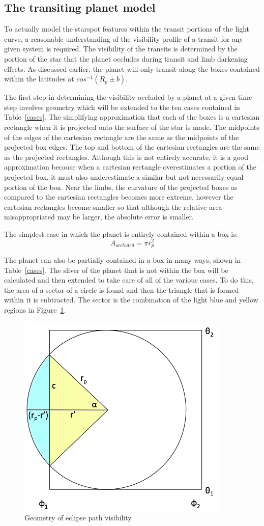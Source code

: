 \subsection{The transiting planet model \label{transit_model}}
To actually model the starspot features within the transit portions of the light curve, a reasonable understanding of the visibility profile of a transit for any given system is required. The visibility of the transits is determined by the portion of the star that the planet occludes during transit and limb darkening effects. As discussed earlier, the planet will only transit along the boxes contained within the latitudes at $cos^{-1}(R_p \pm b)$. 
 
The first step in determining the visibility occluded by a planet at a given time step involves geometry which will be extended to the ten cases contained in Table~\ref{cases}. The simplifying approximation that each of the boxes is a cartesian rectangle when it is projected onto the surface of the star is made. The midpoints of the edges of the cartesian rectangle are the same as the midpoints of the projected box edges. The top and bottom of the cartesian rectangles are the same as the projected rectangles. Although this is not entirely accurate, it is a good approximation because when a cartesian rectangle overestimates a portion of the projected box, it must also underestimate a similar but not necessarily equal portion of the box. Near the limbs, the curvature of the projected boxes as compared to the cartesian rectangles becomes more extreme, however the cartesian rectangles become smaller so that although the relative area misappropriated may be larger, the absolute error is smaller.

The simplest case in which the planet is entirely contained within a box is:
\begin{equation}
	A_{occluded} = \pi r_p^2
\end{equation}

The planet can also be partially contained in a box in many ways, shown in Table~\ref{cases}. The sliver of the planet that is not within the box will be calculated and then extended to take care of all of the various cases. To do this, the area of a sector of a circle is found and then the triangle that is formed within it is subtracted. The sector is the combination of the light blue and yellow regions in Figure~\ref{eclipse}.
\begin{figure}[h]
	\centering
	\includegraphics[width=.5\textwidth]{images/figure.png}
	\caption{Geometry of eclipse path visibility.}
	\label{eclipse}
\end{figure}

